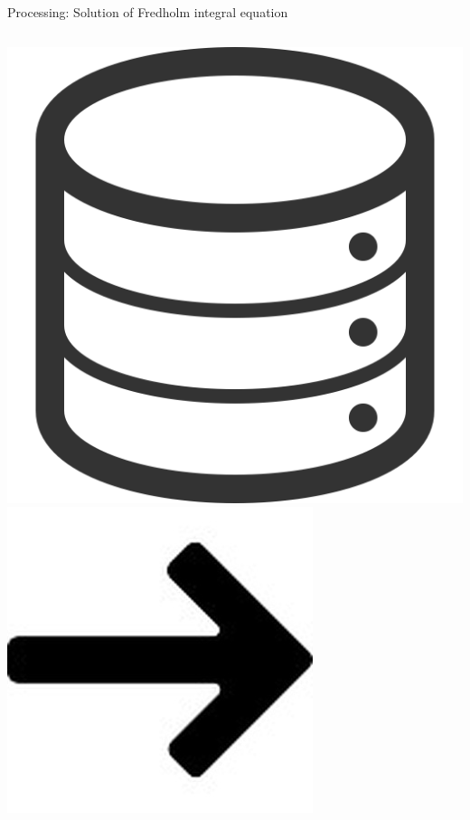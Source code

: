 \documentclass[8pt,pdf,hyperref={unicode}]{beamer}
\begin{document}
\begin{frame}
     \begin{block}{Processing: Solution of Fredholm integral equation}
         \begin{columns}
             \includegraphics[width=\textwidth]{image/data512.png}
             \includegraphics[width=\textwidth]{image/next_318-140722.jpg}                            

\end{columns}
\end{block}
\end{frame}
\end{document}

